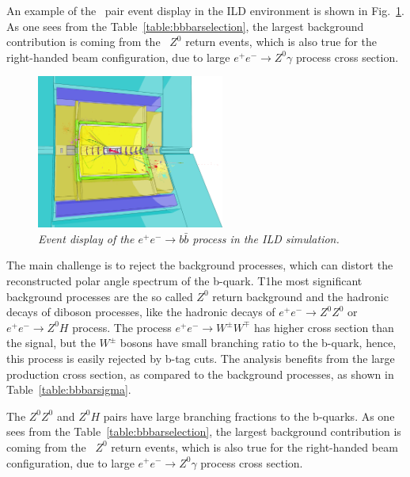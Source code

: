 An example of the \bbbar\ pair event display in the ILD environment is shown in Fig.~\ref{fig:BottomEvent_3}. As one sees from the Table~\ref{table:bbbarselection}, the largest background contribution is coming from the \bbbar\ $Z^0$ return events, which is also true for the right-handed beam configuration, due to large $e^+e^-\to Z^0\gamma$ process cross section.
\begin{figure}
	{\centering
		\includegraphics[clip, trim=0.cm 0cm 7.9cm 0cm, width=0.55\textwidth]{ILD/graphics/ild-bbbar.png}
		\caption{\sl Event display of the $e^+e^-\to b\bar{b}$ process in the ILD simulation.
		}
		\label{fig:BottomEvent_3}
	}
	
\end{figure}

The main challenge is to reject the background processes, which can distort the reconstructed polar angle spectrum of the b-quark. 
T1he most significant background processes are the so called $Z^0$ return background and the hadronic decays of diboson processes, like the hadronic decays of $e^+e^-\to Z^0Z^0$ or $e^+e^-\to Z^0H$ process. The process $e^+e^-\to W^\pm W^\mp$ has higher cross section than the signal, but the $W^\pm$ bosons have small branching ratio to the b-quark, hence, this process is easily rejected by b-tag cuts. 
The analysis benefits from the large production cross section, as compared to the background processes, as shown in Table~\ref{table:bbbarsigma}.

The $Z^0Z^0$ and $Z^0H$ pairs have large branching fractions to the b-quarks. 
As one sees from the Table~\ref{table:bbbarselection}, the largest background contribution is coming from the \bbbar\ $Z^0$ return events, which is also true for the right-handed beam configuration, due to large $e^+e^-\to Z^0\gamma$ process cross section.

